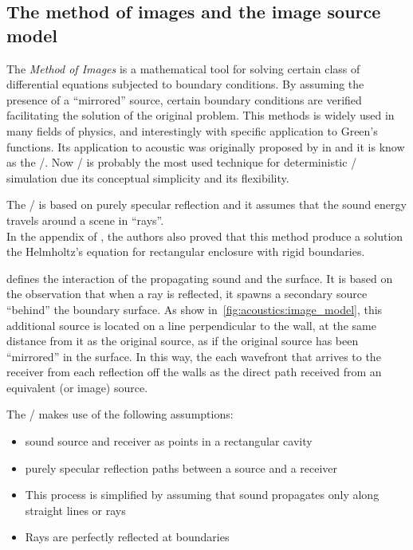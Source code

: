 \subsection{The method of images and the image source model}\label{subsec:acoustics:ism}
The \textit{Method of Images} is a mathematical tool for solving certain class of differential equations subjected to boundary conditions.
By assuming the presence of a ``mirrored'' source, certain boundary conditions are verified facilitating the solution of the original problem.
This methods is widely used in many fields of physics, and interestingly with specific application to Green's functions.
Its application to acoustic was originally proposed by \citeauthor{allen1979image} in  and it is know as the \ISMdef/.
Now \ISM/ is probably the most used technique for deterministic \RIR/ simulation due its conceptual simplicity and its flexibility.

The \ISM/ is based on purely specular reflection and it assumes that the sound energy travels around a scene in ``rays''.
\\In the appendix of , the authors also proved that this method produce a solution the Helmholtz's equation
for rectangular enclosure with rigid boundaries.

 defines the interaction of the propagating sound and the surface.
It is based on the observation that when a ray is reflected, it spawns a secondary source ``behind'' the boundary surface.
As show in~\cref{fig:acoustics:image_model}, this additional source is located on a line perpendicular to the wall, at the same distance from it as the original source, as if the original source has been “mirrored” in the surface.
In this way, the each wavefront that arrives to the receiver from each reflection off the walls as the direct path received from an equivalent (or image) source.

The \ISM/ makes use of the following assumptions:
\begin{itemize}
    \item sound source and receiver as points in a rectangular cavity
    \item purely specular reflection paths between a source and a receiver
    \item This process is simplified by assuming that sound propagates only along straight lines or rays
    \item Rays are perfectly reflected at boundaries
\end{itemize}

